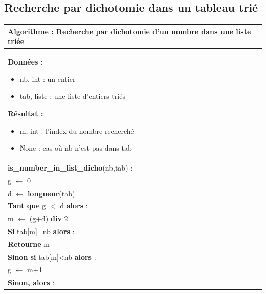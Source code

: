\documentclass[10pt]{article}
\begin{document}
\subsection{Recherche par dichotomie dans un tableau trié}


\begin{minipage}[c]{.48\linewidth}
\begin{pseudo}
\begin{center}
\begin{tabular}{p{}}
\hline
\textbf{Algorithme :} Recherche par dichotomie d'un nombre dans une liste triée\\
\hline
\textbf{Données :}
\begin{itemize}
\item \textsf{nb}, int : un entier 
\item \textsf{tab}, liste : une liste d'entiers triés
\end{itemize}
\textbf{Résultat :} 
\begin{itemize}
\item \textsf{m}, int : l'index du nombre recherché
\item \textsf{None} : cas où \textsf{nb} n'est pas dans \textsf{tab}
\end{itemize}
\\
\textbf{is\_number\_in\_list\_dicho}(\textsf{nb},\textsf{tab}) :\\
\hspace{.4cm}\textsf{g} $\leftarrow$ \textsf{0} \\
\hspace{.4cm}\textsf{d} $\leftarrow$ \textbf{longueur}(\textsf{tab}) \\
\hspace{.4cm}\textbf{Tant que} \textsf{g $<$ d} \textbf{alors} : \\
\hspace{.8cm} \textsf{m} $\leftarrow$ \textsf{(g+d)} \textbf{div} \textsf{2}\\
\hspace{1.2cm}\textbf{Si} \textsf{tab[m]=nb} \textbf{alors} :\\
\hspace{1.6cm}\textbf{Retourne} \textsf{m}\\
\hspace{1.2cm}\textbf{Sinon si} \textsf{tab[m]<nb} \textbf{alors} :\\
\hspace{1.6cm}\textsf{g} $\leftarrow$ \textsf{m+1}\\
\hspace{1.2cm}\textbf{Sinon, alors} :\\

\end{tabular}
\end{center}
\end{pseudo}
\end{minipage}
\end{document}
